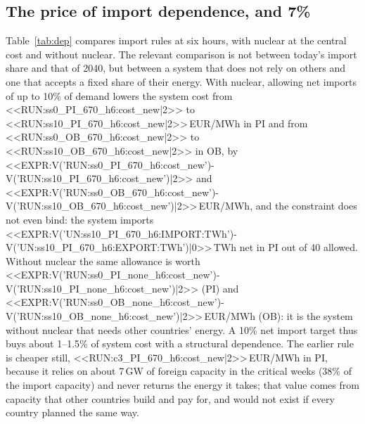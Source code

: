 \begin{table}[htbp]
\centering
\caption{Central values under net self-sufficiency, and the variant with imports with a capacity credit (earlier rule). Cost in EUR/MWh; share of total demand in \%; gap = cost without nuclear minus cost with nuclear. The central value is the three-hour result.}\label{tab:central}

\end{table}

\begin{table}[htbp]
\centering
\caption{Convergence of the gap with the time step (EUR/MWh). The limit for $h\to0$ is $G_0$ of the Richardson estimate. * ratio outside 0.35--0.65: extrapolation not reliable (n.a., not computed). Rows under the capacity-credit rule at fixN 598 (two and four years) and 670 (four years), and under net self-sufficiency at 670 (four years).}\label{tab:conv}

\end{table}

\subsection{The price of import dependence, and 7\%}\label{sec:dep}
Table~\ref{tab:dep} compares import rules at six hours, with nuclear at the central cost and without nuclear. The relevant comparison is not between today's import share and that of 2040, but between a system that does not rely on others and one that accepts a fixed share of their energy. With nuclear, allowing net imports of up to 10\% of demand lowers the system cost from <<RUN:ss0_PI_670_h6:cost_new|2>> to <<RUN:ss10_PI_670_h6:cost_new|2>>\,EUR/MWh in PI and from <<RUN:ss0_OB_670_h6:cost_new|2>> to <<RUN:ss10_OB_670_h6:cost_new|2>> in OB, by <<EXPR:V('RUN:ss0_PI_670_h6:cost_new')-V('RUN:ss10_PI_670_h6:cost_new')|2>> and <<EXPR:V('RUN:ss0_OB_670_h6:cost_new')-V('RUN:ss10_OB_670_h6:cost_new')|2>>\,EUR/MWh, and the constraint does not even bind: the system imports <<EXPR:V('UN:ss10_PI_670_h6:IMPORT:TWh')-V('UN:ss10_PI_670_h6:EXPORT:TWh')|0>>\,TWh net in PI out of 40 allowed. Without nuclear the same allowance is worth <<EXPR:V('RUN:ss0_PI_none_h6:cost_new')-V('RUN:ss10_PI_none_h6:cost_new')|2>> (PI) and <<EXPR:V('RUN:ss0_OB_none_h6:cost_new')-V('RUN:ss10_OB_none_h6:cost_new')|2>>\,EUR/MWh (OB): it is the system without nuclear that needs other countries' energy. A 10\% net import target thus buys about 1--1.5\% of system cost with a structural dependence. The earlier rule is cheaper still, <<RUN:c3_PI_670_h6:cost_new|2>>\,EUR/MWh in PI, because it relies on about 7\,GW of foreign capacity in the critical weeks (38\% of the import capacity) and never returns the energy it takes; that value comes from capacity that other countries build and pay for, and would not exist if every country planned the same way.

